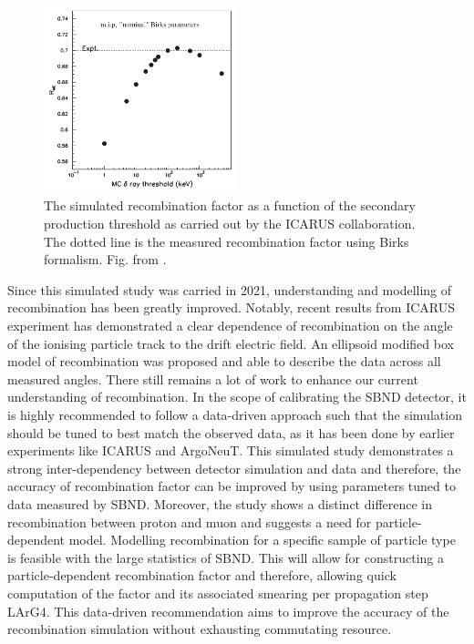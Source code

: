 \begin{figure}[htbp!]
\centering 
\includegraphics[width=0.5\textwidth]{icarus_recomb}
\caption{
The simulated recombination factor as a function of the secondary production threshold as carried out by the ICARUS collaboration.
The dotted line is the measured recombination factor using Birks formalism. 
Fig. from \cite{icarus_recomb}.
}
\label{fig:icarus_recomb}

\end{figure}
Since this simulated study was carried in 2021, understanding and modelling of recombination has been greatly improved.
Notably, recent results from ICARUS experiment \cite{} has demonstrated a clear dependence of recombination on the angle of the ionising particle track to the drift electric field. 
An ellipsoid modified box model of recombination was proposed and able to describe the data across all measured angles. 
There still remains a lot of work to enhance our current understanding of recombination.
In the scope of calibrating the SBND detector, it is highly recommended to follow a data-driven approach such that the simulation should be tuned to best match the observed data, as it has been done by earlier experiments like ICARUS and ArgoNeuT.
This simulated study demonstrates a strong inter-dependency between detector simulation and data and therefore, the accuracy of recombination factor can be improved by using parameters tuned to data measured by SBND.
Moreover, the study shows a distinct difference in recombination between proton and muon and suggests a need for particle-dependent model.
Modelling recombination for a specific sample of particle type is feasible with the large statistics of SBND. 
This will allow for constructing a particle-dependent recombination factor and therefore, allowing quick computation of the factor and its associated smearing per propagation step LArG4. 
This data-driven recommendation aims to improve the accuracy of the recombination simulation without exhausting commutating resource.
